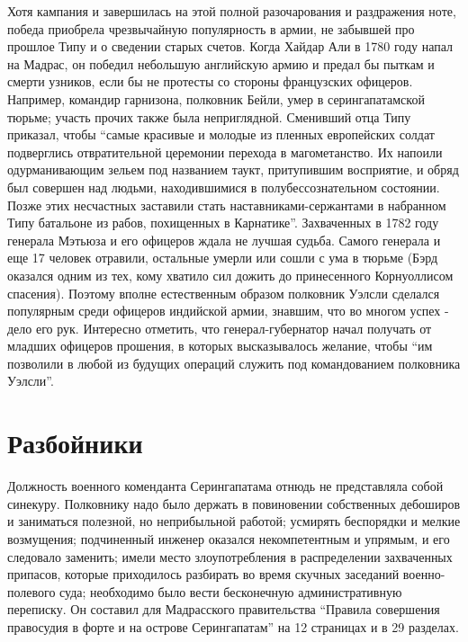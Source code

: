 \documentclass[
  oneside,
  12pt,
  titlepage]{book}
\begin{document}
Хотя кампания и завершилась на этой полной разочарования и раздражения ноте, победа приобрела чрезвычайную популярность в армии, не забывшей про прошлое Типу и о сведении старых счетов. Когда Хайдар Али в 1780 году напал на Мадрас, он победил небольшую английскую армию и предал бы пыткам и смерти узников, если бы не протесты со стороны французских офицеров. Например, командир гарнизона, полковник Бейли, умер в серингапатамской тюрьме; участь прочих также была неприглядной. Сменивший отца Типу приказал, чтобы ``самые красивые и молодые из пленных европейских солдат подверглись отвратительной церемонии перехода в магометанство. Их напоили одурманивающим зельем под названием таукт, притупившим восприятие, и обряд был совершен над людьми, находившимися в полубессознательном состоянии. Позже этих несчастных заставили стать наставниками-сержантами в набранном Типу батальоне из рабов, похищенных в Карнатике''. Захваченных в 1782 году генерала Мэтьюза и его офицеров ждала не лучшая судьба. Самого генерала и еще 17 человек отравили, остальные умерли или сошли с ума в тюрьме (Бэрд оказался одним из тех, кому хватило сил дожить до принесенного Корнуоллисом спасения). Поэтому вполне естественным образом полковник Уэлсли сделался популярным среди офицеров индийской армии, знавшим, что во многом успех - дело его рук. Интересно отметить, что генерал-губернатор начал получать от младших офицеров прошения, в которых высказывалось желание, чтобы ``им позволили в любой из будущих операций служить под командованием полковника Уэлсли''.

\hypertarget{ux440ux430ux437ux431ux43eux439ux43dux438ux43aux438}{%
\chapter{Разбойники}\label{ux440ux430ux437ux431ux43eux439ux43dux438ux43aux438}}

Должность военного коменданта Серингапатама отнюдь не представляла собой синекуру. Полковнику надо было держать в повиновении собственных дебоширов и заниматься полезной, но неприбыльной работой; усмирять беспорядки и мелкие возмущения; подчиненный инженер оказался некомпетентным и упрямым, и его следовало заменить; имели место злоупотребления в распределении захваченных припасов, которые приходилось разбирать во время скучных заседаний военно-полевого суда; необходимо было вести бесконечную административную переписку. Он составил для Мадрасского правительства ``Правила совершения правосудия в форте и на острове Серингапатам'' на 12 страницах и в 29 разделах.
\end{document}
